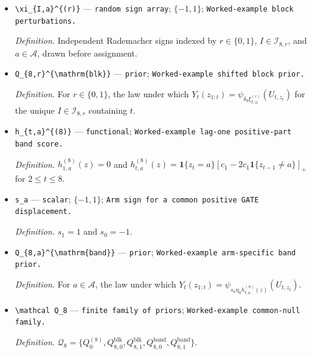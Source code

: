 \documentclass{article}
\begin{document}
\begin{itemize}
  \item \texttt{\textbackslash{}\allowbreak{}xi\_\allowbreak{}\{I,\allowbreak{}a\}\allowbreak{}\textasciicircum{}\{(r)\}\allowbreak{}} --- \texttt{random sign array}; \(\{-1,1\}\); \texttt{Worked-\allowbreak{}example block perturbations.}
  \par\smallskip\noindent\emph{Definition.} Independent Rademacher signs indexed by \(r\in\{0,1\}\), \(I\in\mathcal I_{8,r}\), and \(a\in\mathcal A\), drawn before assignment.
  \item \texttt{Q\_\allowbreak{}\{8,\allowbreak{}r\}\allowbreak{}\textasciicircum{}\{\textbackslash{}\allowbreak{}mathrm\{blk\}\allowbreak{}\}\allowbreak{}} --- \texttt{prior}; \texttt{Worked-\allowbreak{}example shifted block prior.}
  \par\smallskip\noindent\emph{Definition.} For \(r\in\{0,1\}\), the law under which \(Y_t(z_{1:t})=\psi_{\delta_8\xi_{I,z_t}^{(r)}}(U_{t,z_t})\) for the unique \(I\in\mathcal I_{8,r}\) containing \(t\).
  \item \texttt{h\_\allowbreak{}\{t,\allowbreak{}a\}\allowbreak{}\textasciicircum{}\{(8)\}\allowbreak{}} --- \texttt{functional}; \texttt{Worked-\allowbreak{}example lag-\allowbreak{}one positive-\allowbreak{}part band score.}
  \par\smallskip\noindent\emph{Definition.} \(h_{1,a}^{(8)}(z)=0\) and \(h_{t,a}^{(8)}(z)=\mathbf 1\{z_t=a\}[c_1-2c_1\mathbf 1\{z_{t-1}\ne a\}]_+\) for \(2\le t\le8\).
  \item \texttt{s\_\allowbreak{}a} --- \texttt{scalar}; \(\{-1,1\}\); \texttt{Arm sign for a common positive GATE displacement.}
  \par\smallskip\noindent\emph{Definition.} \(s_1=1\) and \(s_0=-1\).
  \item \texttt{Q\_\allowbreak{}\{8,\allowbreak{}a\}\allowbreak{}\textasciicircum{}\{\textbackslash{}\allowbreak{}mathrm\{band\}\allowbreak{}\}\allowbreak{}} --- \texttt{prior}; \texttt{Worked-\allowbreak{}example arm-\allowbreak{}specific band prior.}
  \par\smallskip\noindent\emph{Definition.} For \(a\in\mathcal A\), the law under which \(Y_t(z_{1:t})=\psi_{s_a\eta_8h_{t,a}^{(8)}(z)}(U_{t,z_t})\).
  \item \texttt{\textbackslash{}\allowbreak{}mathcal Q\_\allowbreak{}8} --- \texttt{finite family of priors}; \texttt{Worked-\allowbreak{}example common-\allowbreak{}null family.}
  \par\smallskip\noindent\emph{Definition.} \(\mathcal Q_8=\{Q_0^{(8)},Q_{8,0}^{\mathrm{blk}},Q_{8,1}^{\mathrm{blk}},Q_{8,0}^{\mathrm{band}},Q_{8,1}^{\mathrm{band}}\}\).

\end{itemize}
\end{document}
